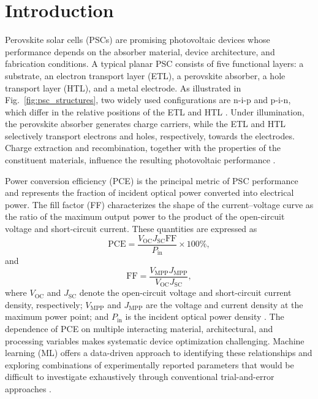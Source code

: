 \documentclass[3p]{elsarticle}
\begin{document}
\section{Introduction}

Perovskite solar cells (PSCs) are promising photovoltaic devices whose performance depends on the absorber material, device architecture, and fabrication conditions. A typical planar PSC consists of five functional layers: a substrate, an electron transport layer (ETL), a perovskite absorber, a hole transport layer (HTL), and a metal electrode. As illustrated in Fig.~\ref{fig:psc_structures}, two widely used configurations are n-i-p and p-i-n, which differ in the relative positions of the ETL and HTL \cite{jung2015perovskite,zuo2016advances}. Under illumination, the perovskite absorber generates charge carriers, while the ETL and HTL selectively transport electrons and holes, respectively, towards the electrodes. Charge extraction and recombination, together with the properties of the constituent materials, influence the resulting photovoltaic performance \cite{jung2015perovskite,zuo2016advances}.

Power conversion efficiency (PCE) is the principal metric of PSC performance and represents the fraction of incident optical power converted into electrical power. The fill factor (FF) characterizes the shape of the current--voltage curve as the ratio of the maximum output power to the product of the open-circuit voltage and short-circuit current. These quantities are expressed as
\begin{equation}
\mathrm{PCE} =
\frac{V_{\mathrm{OC}}J_{\mathrm{SC}}\mathrm{FF}}{P_{\mathrm{in}}}
\times 100\%,
\end{equation}
and
\begin{equation}
\mathrm{FF} =
\frac{V_{\mathrm{MPP}}J_{\mathrm{MPP}}}
{V_{\mathrm{OC}}J_{\mathrm{SC}}},
\end{equation}
where $V_{\mathrm{OC}}$ and $J_{\mathrm{SC}}$ denote the open-circuit voltage and short-circuit current density, respectively; $V_{\mathrm{MPP}}$ and $J_{\mathrm{MPP}}$ are the voltage and current density at the maximum power point; and $P_{\mathrm{in}}$ is the incident optical power density \cite{zuo2016advances}. The dependence of PCE on multiple interacting material, architectural, and processing variables makes systematic device optimization challenging. Machine learning (ML) offers a data-driven approach to identifying these relationships and exploring combinations of experimentally reported parameters that would be difficult to investigate exhaustively through conventional trial-and-error approaches \cite{odabasi2019performance,bansal2023machine,li2019predictions,liu2022machine,gok2022predicting}.
\end{document}
